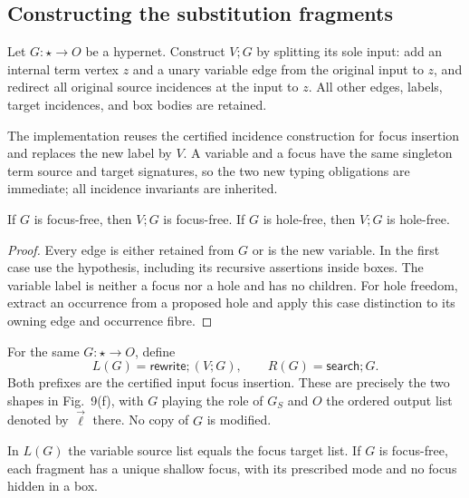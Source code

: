 \subsection{Constructing the substitution fragments}
\begin{definition}
Let $G:\star\to O$ be a hypernet. Construct $V;G$ by splitting its sole input:
add an internal term vertex $z$ and a unary variable edge from the original
input to $z$, and redirect all original source incidences at the input to $z$.
All other edges, labels, target incidences, and box bodies are retained.
\end{definition}
The implementation reuses the certified incidence construction for focus
insertion and replaces the new label by $V$. A variable and a focus have the
same singleton term source and target signatures, so the two new typing
obligations are immediate; all incidence invariants are inherited.
\begin{lemma}
If $G$ is focus-free, then $V;G$ is focus-free. If $G$ is hole-free, then
$V;G$ is hole-free.
\end{lemma}
\begin{proof}
Every edge is either retained from $G$ or is the new variable. In the first
case use the hypothesis, including its recursive assertions inside boxes.
The variable label is neither a focus nor a hole and has no children.
For hole freedom, extract an occurrence from a proposed hole and apply this
case distinction to its owning edge and occurrence fibre.
\end{proof}
\begin{definition}
For the same $G:\star\to O$, define
\[
  L(G)=\mathsf{rewrite};(V;G),\qquad R(G)=\mathsf{search};G.
\]
Both prefixes are the certified input focus insertion. These are precisely
the two shapes in Fig.~9(f), with $G$ playing the role of $G_S$ and $O$ the
ordered output list denoted by $\vec\ell$ there. No copy of $G$ is modified.
\end{definition}
\begin{lemma}
In $L(G)$ the variable source list equals the focus target list.
If $G$ is focus-free, each fragment has a unique shallow focus, with its
prescribed mode and no focus hidden in a box.
\end{lemma}
